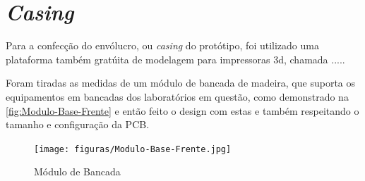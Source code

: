 \section{\textit{Casing}}\label{Casing}

Para a confecção do envólucro, ou \textit{casing} do protótipo, foi utilizado uma plataforma também gratúita de modelagem para impressoras 3d, chamada .....

Foram tiradas as medidas de um módulo de bancada de madeira, que suporta os equipamentos em bancadas dos laboratórios em questão, como demonstrado na \autoref{fig:Modulo-Base-Frente} e então feito o design com estas e também respeitando o tamanho e configuração da \gls{PCB}.

\begin{figure}[htb!]
    \caption{Módulo de Bancada}
    \label{fig:Modulo-Base-Frente}
    \texttt{[image: figuras/Modulo-Base-Frente.jpg]}
    \fonte{}
\end{figure}